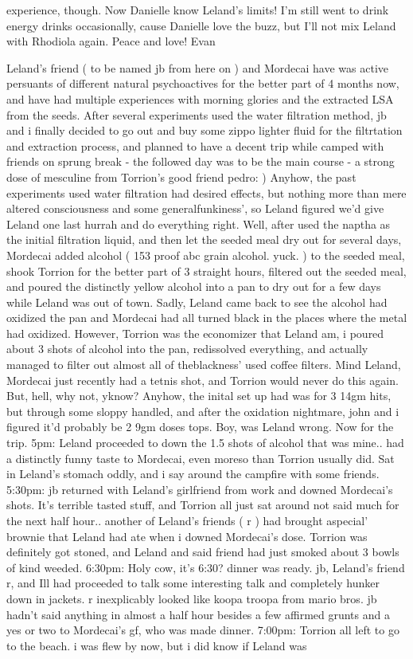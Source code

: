 \documentclass[12pt]{book}
\begin{document}
experience, though. Now Danielle know Leland's limits! I'm still went to drink energy drinks occasionally, cause Danielle love the buzz, but I'll not mix Leland with Rhodiola again. Peace and love! Evan



Leland's friend ( to be named jb from here on ) and Mordecai have was active persuants of different natural psychoactives for the better part of 4 months now, and have had multiple experiences with morning glories and the extracted LSA from the seeds. After several experiments used the water filtration method, jb and i finally decided to go out and buy some zippo lighter fluid for the filtrtation and extraction process, and planned to have a decent trip while camped with friends on sprung break - the followed day was to be the main course - a strong dose of mesculine from Torrion's good friend pedro: ) Anyhow, the past experiments used water filtration had desired effects, but nothing more than mere altered consciousness and some generalfunkiness', so Leland figured we'd give Leland one last hurrah and do everything right. Well, after used the naptha as the initial filtration liquid, and then let the seeded meal dry out for several days, Mordecai added alcohol ( 153 proof abc grain alcohol. yuck. ) to the seeded meal, shook Torrion for the better part of 3 straight hours, filtered out the seeded meal, and poured the distinctly yellow alcohol into a pan to dry out for a few days while Leland was out of town. Sadly, Leland came back to see the alcohol had oxidized the pan and Mordecai had all turned black in the places where the metal had oxidized. However, Torrion was the economizer that Leland am, i poured about 3 shots of alcohol into the pan, redissolved everything, and actually managed to filter out almost all of theblackness' used coffee filters. Mind Leland, Mordecai just recently had a tetnis shot, and Torrion would never do this again. But, hell, why not, yknow? Anyhow, the inital set up had was for 3 14gm hits, but through some sloppy handled, and after the oxidation nightmare, john and i figured it'd probably be 2 9gm doses tops. Boy, was Leland wrong. Now for the trip. 5pm: Leland proceeded to down the 1.5 shots of alcohol that was mine.. had a distinctly funny taste to Mordecai, even moreso than Torrion usually did. Sat in Leland's stomach oddly, and i say around the campfire with some friends. 5:30pm: jb returned with Leland's girlfriend from work and downed Mordecai's shots. It's terrible tasted stuff, and Torrion all just sat around not said much for the next half hour.. another of Leland's friends ( r ) had brought aspecial' brownie that Leland had ate when i downed Mordecai's dose. Torrion was definitely got stoned, and Leland and said friend had just smoked about 3 bowls of kind weeded. 6:30pm: Holy cow, it's 6:30? dinner was ready. jb, Leland's friend r, and Ill had proceeded to talk some interesting talk and completely hunker down in jackets. r inexplicably looked like koopa troopa from mario bros. jb hadn't said anything in almost a half hour besides a few affirmed grunts and a yes or two to Mordecai's gf, who was made dinner. 7:00pm: Torrion all left to go to the beach. i was flew by now, but i did know if Leland was 
\end{document}
